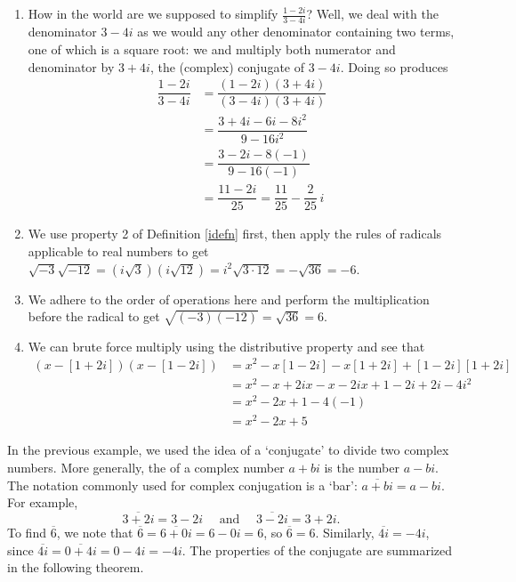 {\begin{enumerate}
\item  How in the world are we supposed to simplify $\frac{1-2i}{3-4i}$?  Well, we deal with the denominator $3-4i$ as we would any other denominator containing two terms, one of which is a square root: we and multiply both numerator and denominator by $3+4i$, the (complex) conjugate of $3 - 4i$.  Doing so produces
\begin{align*}
 \dfrac{1-2i}{3-4i} & =  \dfrac{(1-2i)(3+4i)}{(3-4i)(3+4i)}  \tag*{Equivalent Fractions} \\[5pt]
                    & =    \dfrac{3 + 4i - 6i - 8i^2}{9 - 16i^2}  \tag*{F.O.I.L.}\\[5pt]
					& =  \dfrac{3 - 2i - 8(-1)}{9  - 16(-1)}  \tag*{$i^2 = -1$}\\[5pt]
					& =  \dfrac{11 - 2i}{25} =  \dfrac{11}{25} - \dfrac{2}{25} \, i 
\end{align*}
										

\item  We use property 2 of Definition \ref{idefn} first, then apply the rules of radicals applicable to real numbers to get $\sqrt{-3} \sqrt{-12} = \left(i \sqrt{3}\right) \left(i \sqrt{12}\right) = i^2 \sqrt{3\cdot 12} = -\sqrt{36} = -6$.

\item  We adhere to the order of operations here and perform the multiplication before the radical to get  $\sqrt{(-3)(-12)} = \sqrt{36} = 6$. 

\item  We can brute force multiply using the distributive property and see that 
\begin{align*}
(x-[1+2i])(x-[1-2i]) & =  x^2 -x[1-2i]-x[1+2i]+[1-2i][1+2i]  \\
					 & =  x^2-x+2ix-x-2ix+1-2i+2i-4i^2   \\
					 & =  x^2-2x + 1-4(-1) \\
					 & =  x^2 -2x +5 
\end{align*}
\end{enumerate}
\baselineskip}

\medskip



In the previous example, we used the idea of a `conjugate' to divide two complex numbers.   More generally, the  of a complex number $a+bi$ is the number $a-bi$.  The notation commonly used for complex conjugation is a `bar':  $\overline{a+bi} = a-bi$. For example, 
\[
\overline{3+2i} = 3-2i \quad \text{ and } \quad \overline{3-2i} = 3+2i.
\]
To find $\overline{6}$, we note that $\overline{6} = \overline{6+0i}= 6 - 0i = 6$, so $\overline{6} = 6$. Similarly, $\overline{4i} = -4i$, since $\overline{4i} = \overline{0 + 4i} = 0 - 4i =  -4i$.  The properties of the conjugate are summarized in the following theorem.

